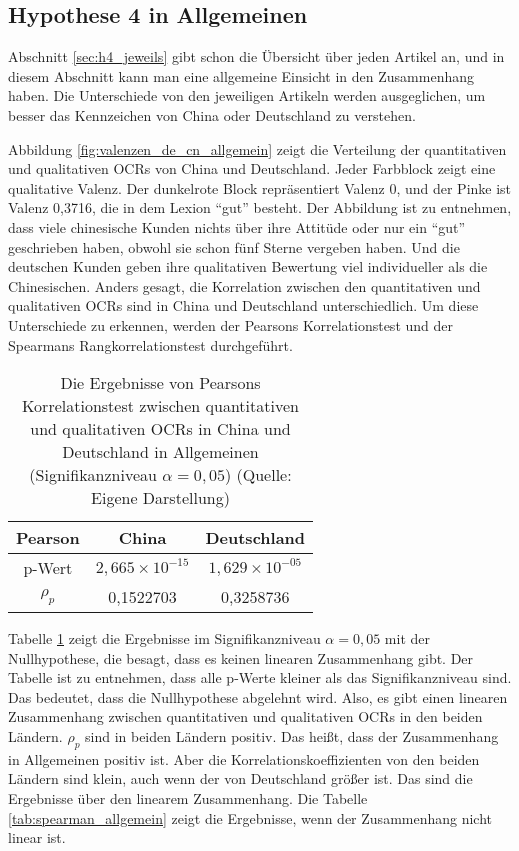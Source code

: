 \subsection{Hypothese 4 in Allgemeinen}
Abschnitt \ref{sec:h4_jeweils} gibt schon die Übersicht über jeden Artikel an, und in diesem Abschnitt kann man eine allgemeine Einsicht in den Zusammenhang haben. Die Unterschiede von den jeweiligen Artikeln werden ausgeglichen, um besser das Kennzeichen von China oder Deutschland zu verstehen. 

Abbildung \ref{fig:valenzen_de_cn_allgemein} zeigt die Verteilung der quantitativen und qualitativen \ac{OCRs} von China und Deutschland. Jeder Farbblock zeigt eine qualitative Valenz. Der dunkelrote Block repräsentiert Valenz 0, und der Pinke ist Valenz 0,3716, die in dem Lexion ``gut'' besteht. Der Abbildung ist zu entnehmen, dass viele chinesische Kunden nichts über ihre Attitüde oder nur ein ``gut'' geschrieben haben, obwohl sie schon fünf Sterne vergeben haben. Und die deutschen Kunden geben ihre qualitativen Bewertung viel individueller als die Chinesischen. Anders gesagt, die Korrelation zwischen den quantitativen und qualitativen \ac{OCRs} sind in China und Deutschland unterschiedlich. Um diese Unterschiede zu erkennen, werden der Pearsons Korrelationstest und der Spearmans Rangkorrelationstest durchgeführt.

\begin{table}[h]
\centering
\begin{tabular}{|c|c|c|}
\hline
Pearson & China     & Deutschland \\ \hline
p-Wert  & $2,665 \times 10^{-15}$ & $1,629 \times 10^{-05}$   \\ \hline
${\rho}_p$     & 0,1522703 & 0,3258736   \\ \hline
\end{tabular}
\caption[Die Ergebnisse von Pearsons Korrelationstest zwischen quantitativen und qualitativen OCRs in China und Deutschland in Allgemeinen]{Die Ergebnisse von Pearsons Korrelationstest zwischen quantitativen und qualitativen \ac{OCRs} in China und Deutschland in Allgemeinen (Signifikanzniveau $\alpha = 0,05$) (Quelle: Eigene Darstellung)}
\label{tab:pearson_allgemein}
\end{table}

Tabelle \ref{tab:pearson_allgemein} zeigt die Ergebnisse im Signifikanzniveau $\alpha = 0,05$ mit der Nullhypothese, die besagt, dass es keinen linearen Zusammenhang gibt. Der Tabelle ist zu entnehmen, dass alle p-Werte kleiner als das Signifikanzniveau sind. Das bedeutet, dass die Nullhypothese abgelehnt wird. Also, es gibt einen linearen Zusammenhang zwischen quantitativen und qualitativen \ac{OCRs} in den beiden Ländern. ${\rho}_p$ sind in beiden Ländern positiv. Das heißt, dass der Zusammenhang in Allgemeinen positiv ist. Aber die Korrelationskoeffizienten von den beiden Ländern sind klein, auch wenn der von Deutschland größer ist. Das sind die Ergebnisse über den linearem Zusammenhang. Die Tabelle \ref{tab:spearman_allgemein} zeigt die Ergebnisse, wenn der Zusammenhang nicht linear ist.

